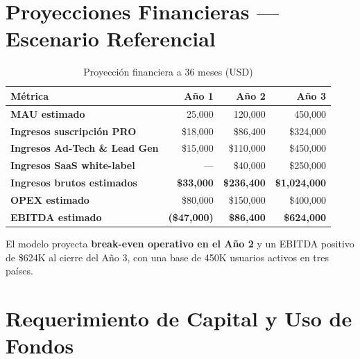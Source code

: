 \documentclass[10.5pt,a4paper]{article}
\newcommand{\tableheadrow}{\rowcolor{unsaMaroon}}
\newcommand{\tablehead}[1]{\color{white}\bfseries #1}
\begin{document}
\section{Proyecciones Financieras — Escenario Referencial}

\begin{table}[htbp]
\centering
\caption{Proyección financiera a 36 meses (USD)}
\begin{tabularx}{\textwidth}{>{\bfseries}X r r r}
\tableheadrow
  \tablehead{Métrica} & \tablehead{Año 1} & \tablehead{Año 2} & \tablehead{Año 3} \\
\midrule
\rowcolor{white}
MAU estimado            & 25,000   & 120,000   & 450,000 \\
\rowcolor{unsaLight}
Ingresos suscripción PRO& \$18,000  & \$86,400  & \$324,000 \\
\rowcolor{white}
Ingresos Ad-Tech \& Lead Gen & \$15,000 & \$110,000 & \$450,000 \\
\rowcolor{unsaLight}
Ingresos SaaS white-label    & —        & \$40,000  & \$250,000 \\
\midrule
\rowcolor{unsaMaroonL}
\bfseries Ingresos brutos estimados  &
  \bfseries\$33,000 & \bfseries\$236,400 & \bfseries\$1,024,000 \\
\rowcolor{white}
OPEX estimado           & \$80,000  & \$150,000 & \$400,000 \\
\rowcolor{unsaGreenL}
\bfseries EBITDA estimado &
  \bfseries\color{unsaMaroon}(\$47,000) & \bfseries\$86,400 & \bfseries\color{unsaGreen}\$624,000 \\
\bottomrule
\end{tabularx}
\end{table}

\begin{successbox}
El modelo proyecta \textbf{break-even operativo en el Año 2} y un EBITDA positivo de \$624K al cierre del Año 3, con una base de 450K usuarios activos en tres países.
\end{successbox}


\section{Requerimiento de Capital y Uso de Fondos}
\end{document}
